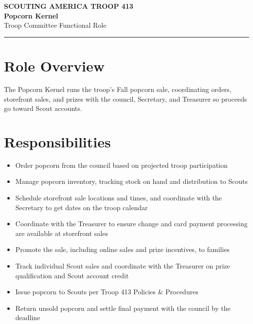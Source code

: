 \documentclass[11pt, letterpaper]{article}
\begin{document}
\begin{center}
  {\small\color{scoutgreen}\textbf{SCOUTING AMERICA \textbullet{} TROOP 413}} \\[4pt]
  {\fontsize{20pt}{24pt}\selectfont\bfseries\color{scoutgreen} Popcorn Kernel} \\[4pt]
  {\large\color{accent} Troop Committee \textbullet{} Functional Role} \\[4pt]
  \textcolor{accent}{\rule{0.6\linewidth}{1pt}}
\end{center}

\vspace{0.3em}

\begin{minipage}[t]{0.48\linewidth}
\raggedright

\section{Role Overview}
The Popcorn Kernel runs the troop's Fall popcorn sale, coordinating orders, storefront sales, and prizes with the council, Secretary, and Treasurer so proceeds go toward Scout accounts.

\vspace{0.4em}
\section{Responsibilities}
\begin{itemize}
  \item Order popcorn from the council based on projected troop participation
  \item Manage popcorn inventory, tracking stock on hand and distribution to Scouts
  \item Schedule storefront sale locations and times, and coordinate with the Secretary to get dates on the troop calendar
  \item Coordinate with the Treasurer to ensure change and card payment processing are available at storefront sales
  \item Promote the sale, including online sales and prize incentives, to families
  \item Track individual Scout sales and coordinate with the Treasurer on prize qualification and Scout account credit
  \item Issue popcorn to Scouts per Troop 413 Policies \& Procedures
  \item Return unsold popcorn and settle final payment with the council by the deadline
\end{itemize}


\end{minipage}
\end{document}
